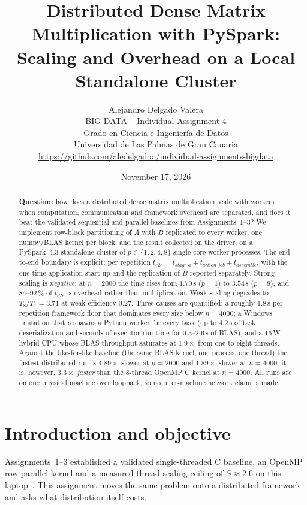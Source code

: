 \documentclass[11pt,a4paper]{article}
\title{\textbf{Distributed Dense Matrix Multiplication with PySpark:\\
Scaling and Overhead on a Local Standalone Cluster}}
\author{Alejandro Delgado Valera\\
\small BIG DATA -- Individual Assignment 4\\
\small Grado en Ciencia e Ingenier{\'i}a de Datos\\
\small Universidad de Las Palmas de Gran Canaria\\
\small \url{https://github.com/aledelgadoo/individual-assignments-bigdata}}
\date{November 17, 2026}
\begin{document}
\maketitle

\begin{abstract}
\noindent\textbf{Question:} how does a distributed dense matrix
multiplication scale with workers when computation, communication and
framework overhead are separated, and does it beat the validated
sequential and parallel baselines from Assignments~1--3? We implement
row-block partitioning of $A$ with $B$ replicated to every worker, one
numpy/BLAS kernel per block, and the result collected on the driver, on a
PySpark~4.3 standalone cluster of $p \in \{1,2,4,8\}$ single-core worker
processes. The end-to-end boundary is explicit: per repetition
$t_{e2e} = t_{stage\_a} + t_{action\_job} + t_{assemble}$, with the
one-time application start-up and the replication of $B$ reported
separately. Strong scaling is \emph{negative}: at $n=2000$ the time rises
from $1.70$\,s ($p=1$) to $3.54$\,s ($p=8$), and 84--92\,\% of $t_{e2e}$
is overhead rather than multiplication. Weak scaling degrades to
$T_8/T_1 = 3.71$ at weak efficiency $0.27$. Three causes are quantified:
a roughly $1.8$\,s per-repetition framework floor that dominates every
size below $n=4000$; a Windows limitation that respawns a Python worker
for every task (up to $4.2$\,s of task deserialization and seconds of
executor run time for $0.3$--$2.6$\,s of BLAS); and a 15\,W hybrid CPU
whose BLAS throughput saturates at $1.9\times$ from one to eight threads.
Against the like-for-like baseline (the same BLAS kernel, one process,
one thread) the fastest distributed run is $4.89\times$ slower at
$n=2000$ and $1.89\times$ slower at $n=4000$; it is, however,
$3.3\times$ \emph{faster} than the 8-thread OpenMP C kernel at $n=4000$.
All runs are on one physical machine over loopback, so no inter-machine
network claim is made.
\end{abstract}

\section{Introduction and objective}

Assignments~1--3 established a validated single-threaded C baseline, an
OpenMP row-parallel kernel and a measured thread-scaling ceiling of
$S \approx 2.6$ on this laptop~\cite{strang2016,fleming1986}. This assignment moves
the same problem onto a distributed framework and asks what distribution
itself costs.
\end{document}
